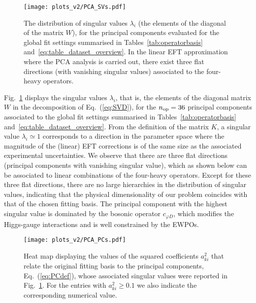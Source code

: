 \begin{figure}[t]
  \begin{center}
    \texttt{[image: plots\_v2/PCA\_SVs.pdf]}
\caption{\small The distribution of singular values $\lambda_i$ (the elements of the diagonal of the
  matrix $W$), for the principal
  components evaluated for the global fit settings
 summarised in Tables~\ref{tab:operatorbasis} and~\ref{eq:table_dataset_overview}.
  In the linear EFT approximation where the PCA analysis is carried out, there exist three flat
  directions (with vanishing singular values) associated to the four-heavy operators.
  \label{fig:PCA_SVs}
  }
  \end{center}
\end{figure}

Fig.~\ref{fig:PCA_SVs} displays the singular values $\lambda_i$, that is,
the elements of the diagonal
matrix $W$ in the decomposition of Eq.~(\ref{eq:SVD}), for the $n_{\rm op}=36$ principal
components associated to the global fit settings
 summarised in Tables~\ref{tab:operatorbasis} and~\ref{eq:table_dataset_overview}.
%
From the definition of the matrix $K$, a singular value $\lambda_i\simeq 1$
corresponds to a direction in the parameter space where the magnitude of the (linear) EFT corrections
is of the same size as the associated experimental uncertainties.
%
We observe that there are three flat directions (principal components with vanishing singular value),
which as shown below can be associated to linear combinations of the four-heavy operators.
%
Except for these three flat directions, there are no large hierarchies in the distribution
of singular values, indicating that the physical dimensionality of our problem coincides
with that of the chosen fitting basis.
%
The principal component with the highest singular value is dominated by the bosonic
operator $c_{\varphi D}$, which modifies
the Higgs-gauge interactions and  is well constrained by the EWPOs.

\begin{figure}[t]
  \begin{center}
    \texttt{[image: plots\_v2/PCA\_PCs.pdf]}
 \caption{\small Heat map displaying
  the values of the squared coefficients $a_{ki}^2$ that relate the original
  fitting basis to the principal components, Eq.~(\ref{eq:PCdef}), whose
  associated singular values were reported in  Fig.~\ref{fig:PCA_SVs}.
  For the entries with $a_{ki}^2 \ge 0.1$ we also indicate the corresponding numerical value.
  \label{fig:PCA_PCs}
  }
  \end{center}
\end{figure}


